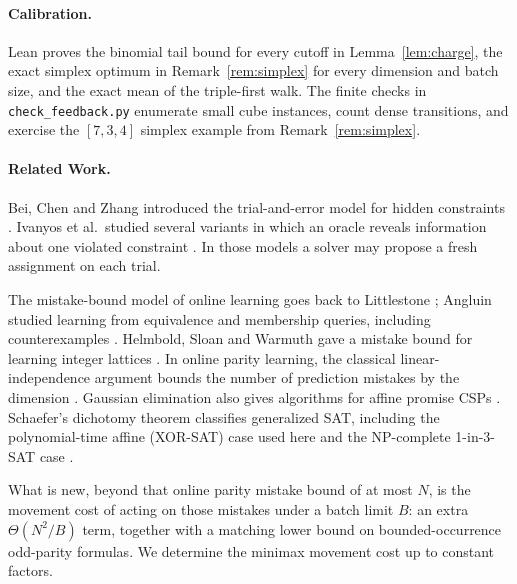 \documentclass[11pt,a4paper]{article}
\theoremstyle{definition}
\theoremstyle{remark}
\begin{document}
\paragraph{Calibration.}
Lean proves the binomial tail bound for every cutoff in Lemma~\ref{lem:charge}, the exact simplex optimum in Remark~\ref{rem:simplex} for every dimension and batch size, and the exact mean of the triple-first walk. The finite checks in \texttt{check\_feedback.py} enumerate small cube instances, count dense transitions, and exercise the $[7,3,4]$ simplex example from Remark~\ref{rem:simplex}.

\paragraph{Related Work.}
Bei, Chen and Zhang introduced the trial-and-error model for hidden constraints \cite{bei2013}. Ivanyos et al.\ studied several variants in which an oracle reveals information about one violated constraint \cite{ivanyos2018}. In those models a solver may propose a fresh assignment on each trial.

The mistake-bound model of online learning goes back to Littlestone \cite{littlestone1988}; Angluin studied learning from equivalence and membership queries, including counterexamples \cite{angluin1988}. Helmbold, Sloan and Warmuth gave a mistake bound for learning integer lattices \cite{helmbold1992}. In online parity learning, the classical linear-independence argument bounds the number of prediction mistakes by the dimension \cite{buhrman2010}. Gaussian elimination also gives algorithms for affine promise CSPs \cite{brakensiek2018}. Schaefer's dichotomy theorem classifies generalized SAT, including the polynomial-time affine (XOR-SAT) case used here and the NP-complete 1-in-3-SAT case \cite{schaefer1978}.

What is new, beyond that online parity mistake bound of at most $N$, is the movement cost of acting on those mistakes under a batch limit $B$: an extra $\Theta(N^2/B)$ term, together with a matching lower bound on bounded-occurrence odd-parity formulas. We determine the minimax movement cost up to constant factors.
\end{document}

